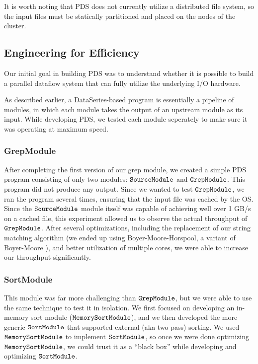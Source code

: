 \documentclass{acm_proc_article-sp}
\begin{document}
It is worth noting that PDS does not currently utilize a distributed file
system, so the input files must be statically partitioned and placed on the nodes of the cluster.

\subsection{Engineering for Efficiency}

Our initial goal in building PDS was to understand whether it is possible to
build a parallel dataflow system that can fully utilize the underlying I/O
hardware.

As described earlier, a DataSeries-based program is essentially a pipeline of
modules, in which each module takes the output of an upstream module as its
input. While developing PDS, we tested each module seperately to make sure it
was operating at maximum speed.

\subsubsection{GrepModule}

After completing the first version of our grep
  module, we created a simple PDS program consisting of only two modules: $\tt
  SourceModule$ and $\tt GrepModule$. This program did not produce any output.
  Since we wanted to test $\tt GrepModule$, we ran the program several times,
  ensuring that the input file was cached by the OS. Since the $\tt
  SourceModule$ module itself was capable of achieving well over 1 GB/s on a
  cached file, this experiment allowed us to observe the actual throughput of
  $\tt GrepModule$. After several optimizations, including the replacement of
  our string matching algorithm (we ended up using Boyer-Moore-Horspool, a
  variant of Boyer-Moore \cite{boyermoore}), and better utilization of multiple
  cores, we were able to increase our throughput significantly.
  
\subsubsection{SortModule}

This module was far more challenging than $\tt
  GrepModule$, but we were able to use the same technique to test it in
  isolation. We first focused on developing an in-memory sort module ($\tt
  MemorySortModule$), and we then developed the more generic $\tt SortModule$
  that supported external (aka two-pass) sorting. We used $\tt MemorySortModule$
  to implement $\tt SortModule$, so once we were done optimizing $\tt
  MemorySortModule$, we could trust it as a ``black box'' while developing and
  optimizing $\tt SortModule$.
  
\end{document}
